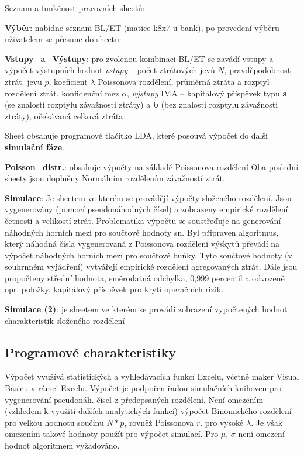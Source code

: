 \documentclass{article}
\begin{document}
Seznam a funkčnost pracovních sheetů:
\begin{compactitem}
\item \textbf{Výběr}: nabídne seznam BL/ET (matice k8x7 u bank), po
  provedení výběru uživatelem se přesune do sheetu:
\item \textbf{Vstupy\_a\_Výstupy}: pro zvolenou kombinaci BL/ET se zavádí vstupy a výpočet výstupních hodnot
\emph{vstupy} – počet ztrátových jevů $N$, pravděpodobnost ztrát. jevu $p$, koeficient $\lambda$ Poissonova rozdělení, průměrná ztráta a rozptyl rozdělení ztrát, konfidenční mez $\alpha$,
\emph{výstupy} IMA – kapitálový příspěvek typu \textbf{a} (se znalostí rozptylu závažnosti ztráty) a \textbf{b} (bez znalosti rozptylu závažnosti ztráty), očekávaná celková ztráta
  
Sheet obsahuje programové tlačítko LDA, které posouvá výpočet do další \textbf{simulační fáze}.
\item \textbf{Poisson\_distr.}: obsahuje výpočty na základě Poissonova rozdělení
Oba poslední sheety jsou doplněny Normálním rozdělením závažností ztrát.
\item \textbf{Simulace}: Je sheetem ve kterém se provádějí výpočty složeného rozdělení. Jsou vygenerovány (pomocí pseudonáhodných čísel) a zobrazeny empirické rozdělení četností a velikostí ztrát. Problematika výpočtu se soustřeďuje na generování náhodných horních mezí pro součtové hodnoty sn. Byl připraven algoritmus, který náhodná čísla vygenerovaná z Poissonova rozdělení výskytů převádí na výpočet náhodných horních mezí pro součtové buňky. Tyto součtové hodnoty (v souhrnném vyjádření) vytvářejí empirické rozdělení agregovaných ztrát. Dále jsou propočteny střední hodnota, směrodatná odchylka, 0,999 percentil a  odvozeně opr. položky, kapitálový příspěvek pro krytí operačních rizik.
\item \textbf{Simulace (2)}: je sheetem ve kterém se provádí zobrazení vypočtených hodnot charakteristik složeného rozdělení
\end{compactitem}

\subsection{Programové charakteristiky}

Výpočet využívá statistických a vyhledávacích funkcí Excelu, včetně maker Visual Basicu v rámci Excelu. Výpočet je podpořen řadou simulačních knihoven pro vygenerování pseudonáh. čísel z předepsaných rozdělení. Není omezením (vzhledem k využití dalších analytických funkcí) výpočet Binomického rozdělení pro velkou hodnotu součinu $N * p$, rovněž Poissonova $r$. pro vysoké $\lambda$. Je však omezením takové hodnoty použít pro výpočet simulací. Pro $\mu$, $\sigma$ není omezení hodnot algoritmem vyžadováno.
\end{document}

